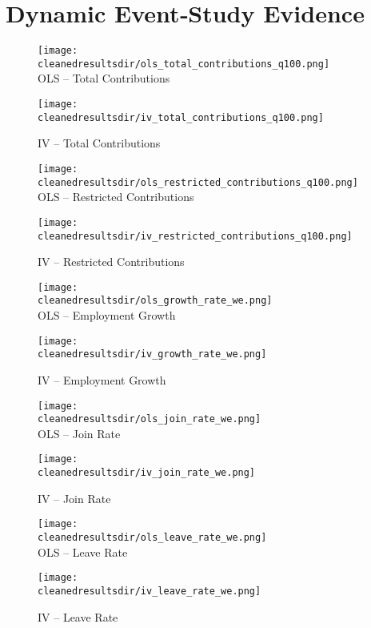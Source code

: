 \documentclass{article}
\newcommand{\cleanedresultsdir}{../results/cleaned}
\begin{document}
\clearpage
\section{Dynamic Event‐Study Evidence}


\begin{figure}[H]
  \centering
  \texttt{[image: \\cleanedresultsdir/ols\_total\_contributions\_q100.png]}\\[2pt]
  \caption*{OLS – Total Contributions}
  \texttt{[image: \\cleanedresultsdir/iv\_total\_contributions\_q100.png]}\\[2pt]
  \caption*{IV – Total Contributions}
\end{figure}

\clearpage

\begin{figure}[H]
  \centering
  \texttt{[image: \\cleanedresultsdir/ols\_restricted\_contributions\_q100.png]}\\[2pt]
  \caption*{OLS – Restricted Contributions}
  \texttt{[image: \\cleanedresultsdir/iv\_restricted\_contributions\_q100.png]}\\[2pt]
  \caption*{IV – Restricted Contributions}
\end{figure}

\clearpage


\begin{figure}[H]
  \centering
  \texttt{[image: \\cleanedresultsdir/ols\_growth\_rate\_we.png]}\\[2pt]
  \caption*{OLS – Employment Growth}
  \texttt{[image: \\cleanedresultsdir/iv\_growth\_rate\_we.png]}\\[2pt]
  \caption*{IV – Employment Growth}
\end{figure}

\clearpage

\begin{figure}[H]
  \centering
  \texttt{[image: \\cleanedresultsdir/ols\_join\_rate\_we.png]}\\[2pt]
  \caption*{OLS – Join Rate}
  \texttt{[image: \\cleanedresultsdir/iv\_join\_rate\_we.png]}\\[2pt]
  \caption*{IV – Join Rate}
\end{figure}

\clearpage

\begin{figure}[H]
  \centering
  \texttt{[image: \\cleanedresultsdir/ols\_leave\_rate\_we.png]}\\[2pt]
  \caption*{OLS – Leave Rate}
  \texttt{[image: \\cleanedresultsdir/iv\_leave\_rate\_we.png]}\\[2pt]
  \caption*{IV – Leave Rate}
\end{figure}
\end{document}
